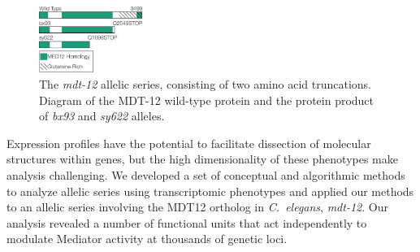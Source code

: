 \documentclass[10pt, twocolumn]{article}
\newcommand{\cel}{\emph{C.~elegans}}
\newcommand{\gene}[1]{\mbox{\emph{#1}}}
\newcommand{\protein}[1]{\mbox{\uppercase{#1}}}
\newcommand{\dpy}{\gene{mdt-12}}
\begin{document}
\begin{figure}
  \centering{}
  \includegraphics[width=0.3\textwidth]{../figs/gene_model_dpy22.pdf}
  \caption{
    The \dpy{} allelic series, consisting of two amino acid truncations. Diagram
    of the \protein{mdt-12} wild-type protein and the protein product of
    \emph{bx93} and \emph{sy622} alleles.
    }
\label{fig:dpy22}
\end{figure}

Expression profiles have the potential to facilitate dissection of molecular
structures within genes, but the high dimensionality of these phenotypes make
analysis challenging. We developed a set of conceptual and
algorithmic methods to analyze allelic series using transcriptomic phenotypes
and applied our methods to an allelic series involving the MDT12 ortholog in
\cel{}, \dpy{}. Our analysis revealed a number of functional units that act
independently to modulate Mediator activity at thousands of genetic loci.
\end{document}
